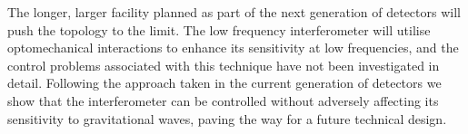 \begin{preface}
The longer, larger \ET{} facility planned as part of the next generation of detectors will push the \MI{} topology to the limit. The low frequency interferometer will utilise optomechanical interactions to enhance its sensitivity at low frequencies, and the control problems associated with this technique have not been investigated in detail. Following the approach taken in the current generation of detectors we show that the interferometer can be controlled without adversely affecting its sensitivity to gravitational waves, paving the way for a future technical design.
\end{preface}